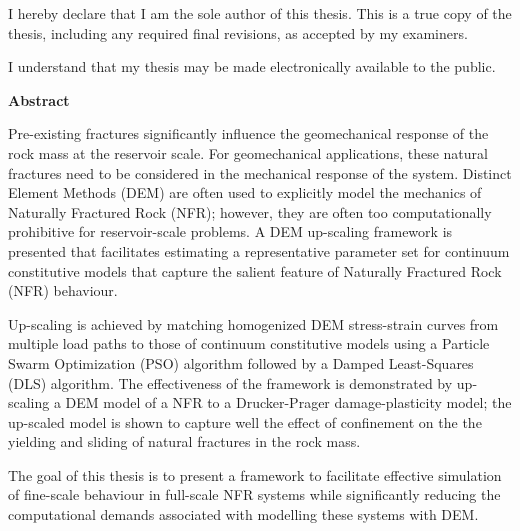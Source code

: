 \cleardoublepage %
 


  \noindent
I hereby declare that I am the sole author of this thesis. This is a true copy of the thesis, including any required final revisions, as accepted by my examiners.

  \bigskip
  
  \noindent
I understand that my thesis may be made electronically available to the public.

\cleardoublepage


\begin{center}\textbf{Abstract}\end{center}

Pre-existing fractures significantly influence the geomechanical response of the rock mass at the reservoir scale. For geomechanical applications, these natural fractures need to be considered in the mechanical response of the system. Distinct Element Methods (DEM) are often used to explicitly model the mechanics of Naturally Fractured Rock (NFR); however, they are often too computationally prohibitive for reservoir-scale problems. A DEM up-scaling framework is presented that facilitates estimating a representative parameter set for continuum constitutive models that capture the salient feature of Naturally Fractured Rock (NFR) behaviour. 

Up-scaling is achieved by matching homogenized DEM stress-strain curves from multiple load paths to those of continuum constitutive models using a Particle Swarm Optimization (PSO) algorithm followed by a Damped Least-Squares (DLS) algorithm. The effectiveness of the framework is demonstrated by up-scaling a DEM model of a NFR to a Drucker-Prager damage-plasticity model; the up-scaled model is shown to capture well the effect of confinement on the the yielding and sliding of natural fractures in the rock mass. 

The goal of this thesis is to present a framework to facilitate effective simulation of fine-scale behaviour in full-scale NFR systems while significantly reducing the computational demands associated with modelling these systems with DEM. 

